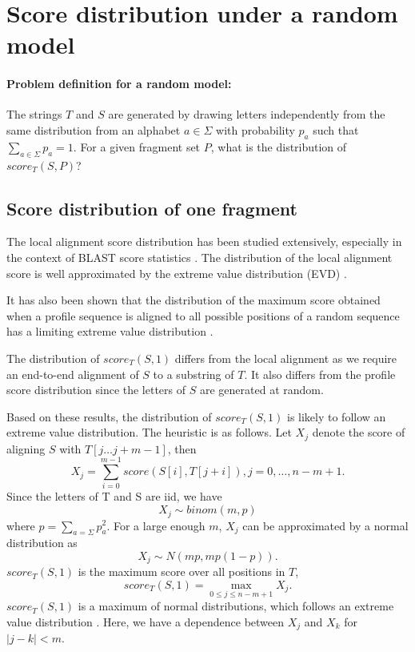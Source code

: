 

\section{Score distribution under a random model}
\paragraph{Problem definition for a random model:}
The strings $T$ and $S$ are generated by drawing letters independently
from the same distribution from an alphabet $a \in \Sigma$ with
probability $p_a$ such that $\sum_{a \in \Sigma} p_a = 1$.
For a given fragment set $P$, what is the distribution of $score_T(S,
P)$?

\subsection{Score distribution of one fragment}
The local alignment score distribution has been studied extensively,
especially in the context of BLAST score statistics
\cite{altschul1990basic,altschul199627}.  The distribution of the local
alignment score is well approximated by the extreme value distribution
(EVD) \cite{karlin1990methods,
karlin1990statistical,dembo1994limit,dembo1991strong}.

It has also been shown that the distribution of the maximum score
obtained when a profile sequence is aligned to all possible positions of
a random sequence has a limiting extreme value distribution
\cite{goldstein1994approximations}.

The distribution of $score_T(S,1)$ differs from the local alignment as
we require an end-to-end alignment of $S$ to a substring of $T$. It also
differs from the profile score distribution since the letters of $S$ are
generated at random.

Based on these results, the distribution of $score_T(S,1)$ is likely to
follow an extreme value distribution. The heuristic is as follows.
Let $X_j$ denote the score of aligning $S$ with $T[j \dots j+m-1]$, then
\[X_j = \sum_{i=0}^{m-1} score(S[i],T[j+i]), j = 0, \dots, n-m+1.\]
Since the letters of T and S are iid, we have \[X_j \sim binom(m,p)\]
where \( p = \sum_{a=\Sigma} p_a^2\).  For a large enough $m$, $X_j$ can
be approximated by a normal distribution as \[X_j \sim N(mp, mp(1-p)).
\] $score_T(S,1)$ is the maximum score over all positions in $T$,
\[score_T(S,1) = \max_{0 \leq j \leq n-m+1} X_j.\] $score_T(S,1)$ is a
maximum of normal distributions, which follows an extreme value
distribution \cite{kotz2000extreme}.
Here, we have a dependence between $X_j$ and $X_k$ for $|j - k| < m$.


